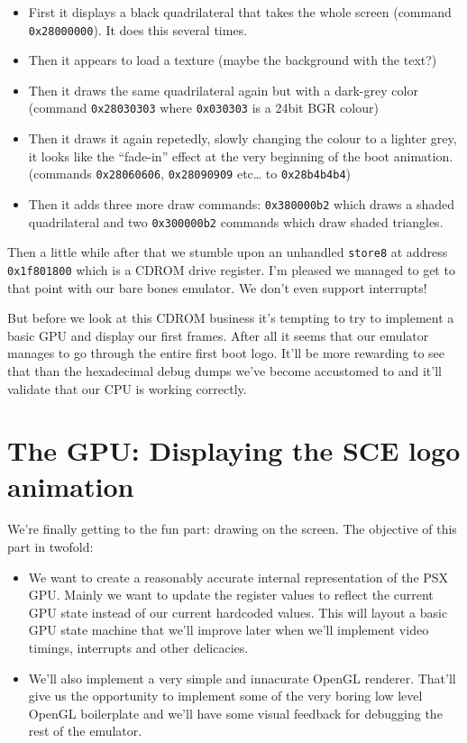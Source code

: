 \documentclass[a4paper]{article}
\newcommand{\code}[1] {\texttt{#1}}
\begin{document}
\begin{itemize}
\item First it displays a black quadrilateral that takes the whole screen
  (command \code{0x28000000}). It does this several times.
\item Then it appears to load a texture (maybe the background with the
  text?)
\item Then it draws the same quadrilateral again but with a dark-grey
  color (command \code{0x28030303} where \code{0x030303} is a 24bit
  BGR colour)
\item Then it draws it again repetedly, slowly changing the colour to a
  lighter grey, it looks like the ``fade-in'' effect at the very
  beginning of the boot animation. (commands \code{0x28060606},
  \code{0x28090909} etc\dots{} to \code{0x28b4b4b4})
\item Then it adds three more draw commands: \code{0x380000b2} which
  draws a shaded quadrilateral and two \code{0x300000b2} commands
  which draw shaded triangles.
\end{itemize}

Then a little while after that we stumble upon an unhandled
\code{store8} at address \code{0x1f801800} which is a CDROM drive
register. I'm pleased we managed to get to that point with our bare
bones emulator. We don't even support interrupts!

But before we look at this CDROM business it's tempting to try to
implement a basic GPU and display our first frames. After all it seems
that our emulator manages to go through the entire first boot
logo. It'll be more rewarding to see that than the hexadecimal debug
dumps we've become accustomed to and it'll validate that our CPU is
working correctly.

\section{The GPU: Displaying the SCE logo animation}

We're finally getting to the fun part: drawing on the screen. The
objective of this part in twofold:

\begin{itemize}
\item We want to create a reasonably accurate internal representation
  of the PSX GPU. Mainly we want to update the register values to
  reflect the current GPU state instead of our current hardcoded
  values. This will layout a basic GPU state machine that we'll
  improve later when we'll implement video timings, interrupts and
  other delicacies.

\item We'll also implement a very simple and innacurate OpenGL
  renderer. That'll give us the opportunity to implement some of the
  very boring low level OpenGL boilerplate and we'll have some visual
  feedback for debugging the rest of the emulator.
\end{itemize}
\end{document}
